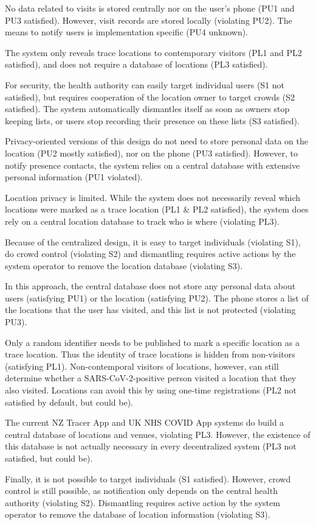 No data related to visits is stored centrally nor on the user's phone (PU1 and PU3 satisfied). However, visit records are stored locally (violating PU2). The means to notify users is implementation specific (PU4 unknown).

The system only reveals trace locations to contemporary visitors (PL1 and PL2 satisfied), and does not require a database of locations (PL3 satisfied).

For security, the health authority can easily target individual users (S1 not satisfied), but requires cooperation of the location owner to target crowds (S2 satisfied). The system automatically dismantles itself as soon as owners stop keeping lists, or users stop recording their presence on these lists (S3 satisfied).

Privacy-oriented versions of this design do not need to store personal data on the location (PU2 mostly satisfied), nor on the phone (PU3 satisfied). However, to notify presence contacts, the system relies on a central database with extensive personal information (PU1 violated). 

Location privacy is limited. While the system does not necessarily reveal which locations were marked as a trace location (PL1 \& PL2 satisfied), the system does rely on a central location database to track who is where (violating PL3).

Because of the centralized design, it is easy to target individuals (violating S1), do crowd control (violating S2) and dismantling requires active actions by the system operator to remove the location database (violating S3).

In this approach, the central database does not store any personal data about users (satisfying PU1) or the location (satisfying PU2). The phone stores a list of the locations that the user has visited, and this list is not protected (violating PU3).

Only a random identifier needs to be published to mark a specific location as a trace location. Thus the identity of trace locations is hidden from non-visitors (satisfying PL1). Non-contemporal visitors of locations, however, can still determine whether a SARS-CoV-2-positive person visited a location that they also visited. Locations can avoid this by using one-time registrations (PL2 not satisfied by default, but could be).

The current NZ Tracer App and UK NHS COVID App systems do build a central database of locations and venues, violating PL3. However, the existence of this database is not actually necessary in every decentralized system (PL3 not satisfied, but could be).

Finally, it is not possible to target individuals (S1 satisfied). However, crowd control is still possible, as notification only depends on the central health authority (violating S2). Dismantling requires active action by the system operator to remove the database of location information (violating S3).
